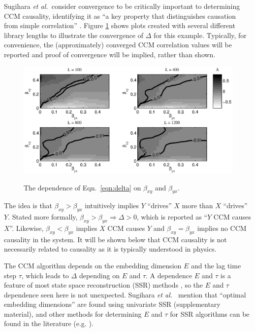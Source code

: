 \documentclass[twocolumn,aps,pre,groupedaddress]{revtex4-1}
\begin{document}
Sugihara {\em et al.\ }consider convergence to be critically important to determining CCM causality, identifying it as ``a key property that distinguishes causation from simple correlation'' \cite{Sugihara2012}.  Figure \ref{fig:BGridPlot} shows plots created with several different library lengths to illustrate the convergence of $\Delta$ for this example.  Typically, for convenience, the (approximately) converged CCM correlation values will be reported and proof of convergence will be implied, rather than shown.
\begin{figure}[ht]
\includegraphics[scale=0.5]{Figure1.eps}\\
\caption{The dependence of Eqn.\ \ref{eqn:delta} on $\beta_{xy}$ and $\beta_{yx}$.}
\label{fig:BGridPlot}
\end{figure}

The idea is that $\beta_{xy}>\beta_{yx}$ intuitively implies $Y$ ``drives'' $X$ more than $X$ ``drives'' $Y$.  Stated more formally, $\beta_{xy}>\beta_{yx}\Rightarrow\Delta>0$, which is reported as ``$Y$ CCM causes $X$''.  Likewise, $\beta_{xy}<\beta_{yx}$ implies $X$ CCM causes $Y$ and $\beta_{xy}=\beta_{yx}$ implies no CCM causality in the system.  It will be shown below that CCM causality is not necessarily related to causality as it is typically understood in physics.

The CCM algorithm depends on the embedding dimension $E$ and the lag time step $\tau$, which leads to $\Delta$ depending on $E$ and $\tau$.  A dependence $E$ and $\tau$ is a feature of most state space reconstruction (SSR) methods \cite{Hong2006,vlachos2009,Small2004}, so the $E$ and $\tau$ dependence seen here is not unexpected.  Sugihara {\em et al.\ } mention that ``optimal embedding dimensions'' are found using univariate SSR \cite{Sugihara2012} (supplementary material), and other methods for determining $E$ and $\tau$ for SSR algorithms can be found in the literature (e.g. \cite{Hong2006,Small2004,Kennel1992}).
\end{document}
